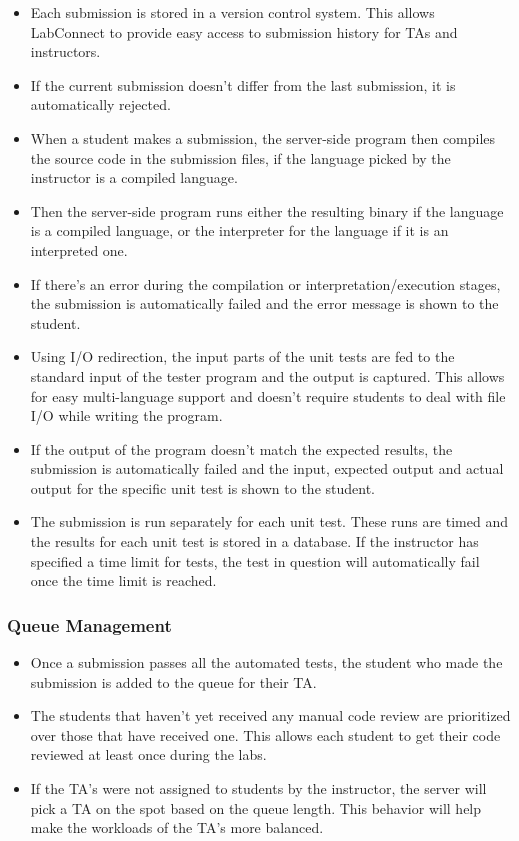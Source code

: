 \documentclass[a4paper, 12pt]{article}
\begin{document}
    \begin{itemize}
      \item Each submission is stored in a version control system. This allows LabConnect to provide easy access to
      submission history for TAs and instructors.
      \item If the current submission doesn't differ from the last submission, it is automatically rejected.
      \item When a student makes a submission, the server-side program then compiles the source code in the submission
      files, if the language picked by the instructor is a compiled language.
      \item Then the server-side program runs either the resulting binary if the language is a compiled language, or the
      interpreter for the language if it is an interpreted one.
      \item If there's an error during the compilation or interpretation/execution stages, the submission is automatically failed and
      the error message is shown to the student.
      \item Using I/O redirection, the input parts of the unit tests are fed to the standard input of the tester program and the output is captured.
      This allows for easy multi-language support and doesn't require students to deal with file I/O while writing the program.
      \item If the output of the program doesn't match the expected results, the submission is automatically failed and the input, expected
      output and actual output for the specific unit test is shown to the student.
      \item The submission is run separately for each unit test. These runs are timed and the results for each unit test is stored in a database.
      If the instructor has specified a time limit for tests, the test in question will automatically fail once the time limit is reached.
    \end{itemize}

    \subsubsection{Queue Management}
    \begin{itemize}
      \item Once a submission passes all the automated tests, the student who made the submission is added to the queue for their TA.
      \item The students that haven't yet received any manual code review are prioritized over those that have received one. This allows each student to
      get their code reviewed at least once during the labs.
      \item If the TA's were not assigned to students by the instructor, the server will pick a TA on the spot based on the queue length. This
      behavior will help make the workloads of the TA's more balanced.
    \end{itemize}
\end{document}
